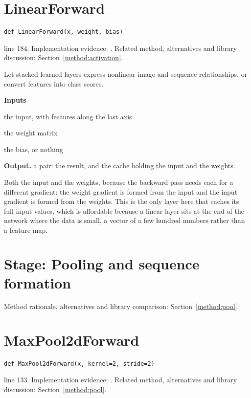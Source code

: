 \section{LinearForward}\label{fn:train:LinearForward}
\begin{lstlisting}[style=sig]
def LinearForward(x, weight, bias)
\end{lstlisting}
 line 184. Implementation evidence: \cite{code2026}. Related method, alternatives and library discussion: Section~\ref{method:activation}.


Let stacked learned layers express nonlinear image and sequence relationships, or convert features into class scores.




\noindent\textbf{Inputs}
\begin{description}[leftmargin=2.2em,style=nextline,font=\normalfont\ttfamily]\setlength\itemsep{1pt}
  \item[{x}] \normalfont the input, with features along the last axis
  \item[{weight}] \normalfont the weight matrix
  \item[{bias}] \normalfont the bias, or nothing
\end{description}

\noindent\textbf{Output.} a pair: the result, and the cache holding the input and the weights.


Both the input and the weights, because the backward pass needs each for a different gradient: the weight gradient is formed from the input and the input gradient is formed from the weights. This is the only layer here that caches its full input values, which is affordable because a linear layer sits at the end of the network where the data is small, a vector of a few hundred numbers rather than a feature map.



\section*{Stage: Pooling and sequence formation}
Method rationale, alternatives and library comparison: Section~\ref{method:pool}.
\section{MaxPool2dForward}\label{fn:train:MaxPool2dForward}
\begin{lstlisting}[style=sig]
def MaxPool2dForward(x, kernel=2, stride=2)
\end{lstlisting}
 line 133. Implementation evidence: \cite{code2026}. Related method, alternatives and library discussion: Section~\ref{method:pool}.


